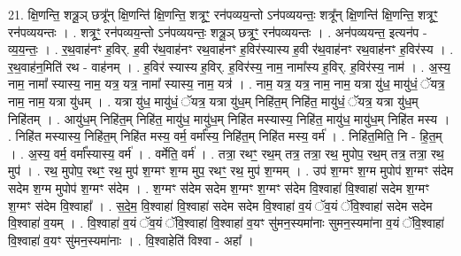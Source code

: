 \documentclass[17pt]{extarticle}
\begin{document}
21. क्षि॒णन्ति॒ शत्रू॒ञ् छत्रू᳚न् क्षि॒णन्ति॑ क्षि॒णन्ति॒ शत्रूꣳ॒॒ रन॑पव्यय॒न्तो ऽन॑पव्ययन्तः॒ शत्रू᳚न् क्षि॒णन्ति॑ क्षि॒णन्ति॒ शत्रूꣳ॒॒ रन॑पव्ययन्तः । . शत्रूꣳ॒॒ रन॑पव्यय॒न्तो ऽन॑पव्ययन्तः॒ शत्रू॒ञ् छत्रूꣳ॒॒ रन॑पव्ययन्तः । . अन॑पव्ययन्त॒ इत्यन॑प - व्य॒य॒न्तः॒ । . र॒थ॒वाह॑नꣳ ह॒विर्. ह॒वी र॑थ॒वाह॑नꣳ रथ॒वाह॑नꣳ ह॒विर॑स्यास्य ह॒वी र॑थ॒वाह॑नꣳ रथ॒वाह॑नꣳ ह॒विर॑स्य । . र॒थ॒वाह॑न॒मिति॑ रथ - वाह॑नम् । . ह॒विर॑ स्यास्य ह॒विर्. ह॒विर॑स्य॒ नाम॒ नामा᳚स्य ह॒विर्. ह॒विर॑स्य॒ नाम॑ । . अ॒स्य॒ नाम॒ नामा᳚ स्यास्य॒ नाम॒ यत्र॒ यत्र॒ नामा᳚ स्यास्य॒ नाम॒ यत्र॑ । . नाम॒ यत्र॒ यत्र॒ नाम॒ नाम॒ यत्रा यु॑ध॒ मायु॑धं॒ ॅयत्र॒ नाम॒ नाम॒ यत्रा यु॑धम् । . यत्रा यु॑ध॒ मायु॑धं॒ ॅयत्र॒ यत्रा यु॑ध॒म् निहि॑त॒म् निहि॑त॒ मायु॑धं॒ ॅयत्र॒ यत्रा यु॑ध॒म् निहि॑तम् । . आयु॑ध॒म् निहि॑त॒म् निहि॑त॒ मायु॑ध॒ मायु॑ध॒म् निहि॑त मस्यास्य॒ निहि॑त॒ मायु॑ध॒ मायु॑ध॒म् निहि॑त मस्य । . निहि॑त मस्यास्य॒ निहि॑त॒म् निहि॑त मस्य॒ वर्म॒ वर्मा᳚स्य॒ निहि॑त॒म् निहि॑त मस्य॒ वर्म॑ । . निहि॑त॒मिति॒ नि - हि॒त॒म् । . अ॒स्य॒ वर्म॒ वर्मा᳚स्यास्य॒ वर्म॑ । . वर्मेति॒ वर्म॑ । . तत्रा॒ रथꣳ॒॒ रथ॒म् तत्र॒ तत्रा॒ रथ॒ मुपोप॒ रथ॒म् तत्र॒ तत्रा॒ रथ॒ मुप॑ । . रथ॒ मुपोप॒ रथꣳ॒॒ रथ॒ मुप॑ श॒ग्मꣳ श॒ग्म मुप॒ रथꣳ॒॒ रथ॒ मुप॑ श॒ग्मम् । . उप॑ श॒ग्मꣳ श॒ग्म मुपोप॑ श॒ग्मꣳ स॑देम सदेम श॒ग्म मुपोप॑ श॒ग्मꣳ स॑देम । . श॒ग्मꣳ स॑देम सदेम श॒ग्मꣳ श॒ग्मꣳ स॑देम वि॒श्वाहा॑ वि॒श्वाहा॑ सदेम श॒ग्मꣳ श॒ग्मꣳ स॑देम वि॒श्वाहा᳚ । . स॒दे॒म॒ वि॒श्वाहा॑ वि॒श्वाहा॑ सदेम सदेम वि॒श्वाहा॑ व॒यं ॅव॒यं ॅवि॒श्वाहा॑ सदेम सदेम वि॒श्वाहा॑ व॒यम् । . वि॒श्वाहा॑ व॒यं ॅव॒यं ॅवि॒श्वाहा॑ वि॒श्वाहा॑ व॒यꣳ सु॑मन॒स्यमा॑नाः सुमन॒स्यमा॑ना व॒यं ॅवि॒श्वाहा॑ वि॒श्वाहा॑ व॒यꣳ सु॑मन॒स्यमा॑नाः । . वि॒श्वाहेति॑ विश्वा - अहा᳚ । \newline
\end{document}
